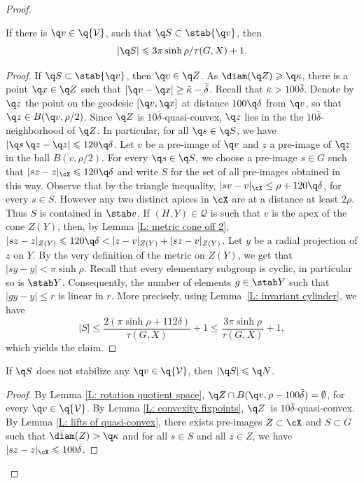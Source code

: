 \begin{proof}
\begin{lem}\label{L: acylindric quotient 2} If there is $\q v \in \q {\mathcal V}$, such that $\q S \subset \stab{\q v}$, then
\[
|\q S|\leqslant 3\pi \sinh\rho/\tau(G,X) +1.
\]
\end{lem}
\begin{proof} If $\q S \subset \stab{\q v}$, then $\q v\in \q Z$.
As $\diam (\q Z)\geqslant \q \kappa$, there is a point $\q x \in \q Z$ such that $|\q v - \q x| \geq \bar \kappa - \bar \delta$.
Recall that $\bar \kappa > 100 \bar \delta$.
Denote by $\q z$ the point on the geodesic $[\q v, \q x]$ at distance $100\q \delta$ from $\q v$, so that $\q z \in B(\q v, \rho/2)$.
Since $\q Z$ is $10\bar \delta$-quasi-convex, $\q z$ lies in the the $10\bar \delta$-neighborhood of $\q Z$.
In particular, for all $\q s \in \q S$, we have $|\q s \,\q z - \q z|\leqslant 120\q \delta$.
Let $v$ be a pre-image of $\q v$ and $z$ a pre-image of $\q z$ in the ball $B(v, \rho/2)$.
For every $\q s \in \q S$, we choose a pre-image $s \in G$ such that $|sz-z|_{\cX}\leqslant120 \q \delta$ and write $S$ for the set of all pre-images obtained in this way.
Observe that by the triangle inequality, $|sv - v|_{\cX} \leq \rho + 120\q\delta$, for every $s \in S$.
However any two distinct apices in $\cX$ are at a distance at least $2\rho$.
Thus $S$ is contained in $\stab v$.
If $(H,Y) \in \mathcal Q$ is such that $v$ is the apex of the cone $Z(Y)$, then, by Lemma \ref{L: metric cone off 2}, $|sz-z|_{Z(Y)}\leqslant 120\q \delta < |z - v|_{Z(Y)} + |sz - v|_{Z(Y)}$.
Let $y$ be a radial projection of $z$ on $Y$.
By the very definition of the metric on $Z(Y)$, we get that $|sy-y|< \pi \sinh\rho$.
Recall that every elementary subgroup is cyclic, in particular so is $\stab Y$.
Consequently, the number of elements $g \in \stab Y$ such that $|gy - y| \leq r$ is linear in $r$.
More precisely, using Lemma~\ref{L: invariant cylinder}, we have
\begin{equation*}
|S|\leqslant \frac{2(\pi \sinh\rho +112\delta)}{\tau(G,X)} + 1\leqslant \frac{3 \pi \sinh\rho}{\tau(G,X)}+1,
\end{equation*}
which yields the claim.
\end{proof}

\begin{lem}\label{L: acylindric quotient 4} If $\q S$ does not stabilize any $\q v \in \q{\mathcal V}$, then $|\q S|\leqslant \q N$.
\end{lem}

\begin{proof}
By Lemma \ref{L: rotation quotient space}, $\q Z \cap B(\q v, \rho- 100 \bar \delta)= \emptyset$, for every $\q v \in \q {\mathcal V}$.
By Lemma \ref{L: convexity fixpoints}, $\q Z$~is $10\bar \delta$-quasi-convex.
By Lemma \ref{L: lifts of quasi-convex}, there exists pre-images ${Z} \subset \cX$ and $S\subset G$ such that $\diam({Z})>\q \kappa$ and for all $s\in S$ and all $z\in Z$, we have $|sz-z|_{\cX}\leqslant 100 \bar \delta$.


\end{proof}
\end{proof}
